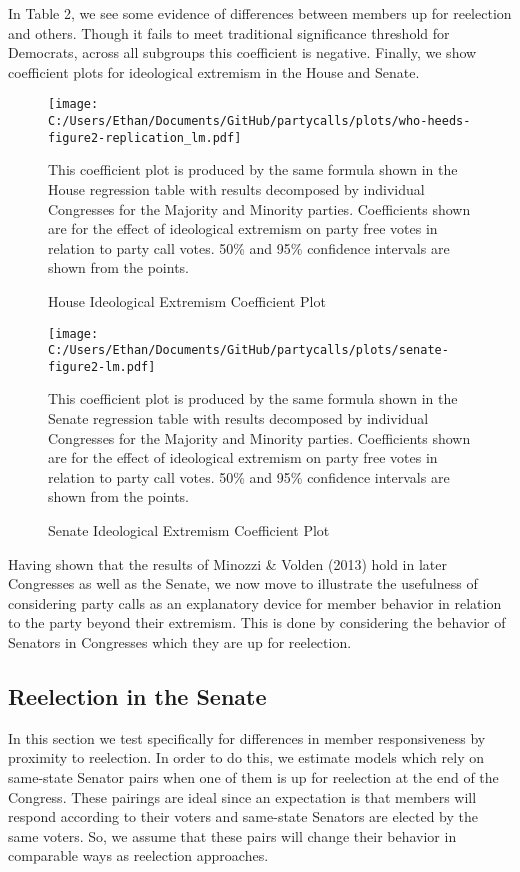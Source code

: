 \documentclass[12pt]{article}
\newcommand\fnote[1]{\captionsetup{font=small}\caption*{#1}}
\begin{document}
In Table 2, we see some evidence of differences between members up for reelection and others. Though it fails to meet traditional significance threshold for Democrats, across all subgroups this coefficient is negative. Finally, we show coefficient plots for ideological extremism in the House and Senate. 

\begin{figure}[H]
	\centering
	\caption{House Ideological Extremism Coefficient Plot}
	\texttt{[image: C:/Users/Ethan/Documents/GitHub/partycalls/plots/who-heeds-figure2-replication\_lm.pdf]}
	\fnote{This coefficient plot is produced by the same formula shown in the House regression table with results decomposed by individual Congresses for the Majority and Minority parties. Coefficients shown are for the effect of ideological extremism on party free votes in relation to party call votes. 50\% and 95\% confidence intervals are shown from the points.}
\end{figure}

\begin{figure}[H]
	\centering
	\caption{Senate Ideological Extremism Coefficient Plot}
	\texttt{[image: C:/Users/Ethan/Documents/GitHub/partycalls/plots/senate-figure2-lm.pdf]}
	\fnote{This coefficient plot is produced by the same formula shown in the Senate regression table with results decomposed by individual Congresses for the Majority and Minority parties. Coefficients shown are for the effect of ideological extremism on party free votes in relation to party call votes. 50\% and 95\% confidence intervals are shown from the points.}
\end{figure}

Having shown that the results of Minozzi \& Volden (2013) hold in later Congresses as well as the Senate, we now move to illustrate the usefulness of considering party calls as an explanatory device for member behavior in relation to the party beyond their extremism. This is done by considering the behavior of Senators in Congresses which they are up for reelection. 

\subsection{Reelection in the Senate}

In this section we test specifically for differences in member responsiveness by proximity to reelection. In order to do this, we estimate models which rely on same-state Senator pairs when one of them is up for reelection at the end of the Congress. These pairings are ideal since an expectation is that members will respond according to their voters and same-state Senators are elected by the same voters. So, we assume that these pairs will change their behavior in comparable ways as reelection approaches. 
\end{document}

